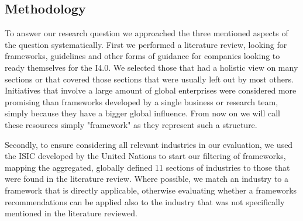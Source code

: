 






\subsection{Methodology}

To answer our research question we approached the three mentioned aspects of the question systematically. First we performed a literature review, looking for frameworks, guidelines and other forms of guidance for companies looking to ready themselves for the \ac{I4.0}. 
We selected those that had a holistic view on many sections or that covered those sections that were usually left out by most others. Initiatives that involve a large amount of global enterprises were considered more promising than frameworks developed by a single business or research team, simply because they have a bigger global influence. From now on we will call these resources simply "framework" as they represent such a structure.

Secondly, to ensure considering all relevant industries in our evaluation, we used the \ac{ISIC} developed by the United Nations to start our filtering of frameworks, mapping the aggregated, globally defined 11 sections of industries \cite{ISIC:2008} to those that were found in the literature review. Where possible, we match an industry to a framework that is directly applicable, otherwise evaluating whether a frameworks recommendations can be applied also to the industry that was not specifically mentioned in the literature reviewed. 

